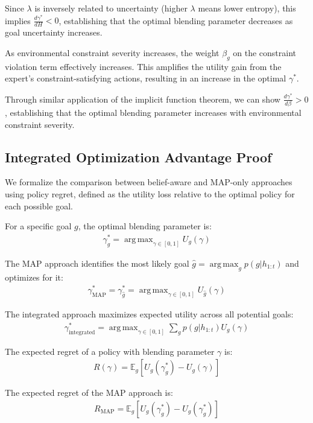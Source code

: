 \documentclass[11pt]{article}
\DeclareMathOperator*{\argmax}{arg\,max}
\begin{document}
Since $\lambda$ is inversely related to uncertainty (higher $\lambda$ means 
lower entropy), this implies $\frac{d\gamma^*}{dH} < 0$, establishing that 
the optimal blending parameter decreases as goal uncertainty increases.

As environmental constraint severity increases, the weight 
$\beta_g$ on the constraint violation term effectively increases. This amplifies 
the utility gain from the expert's constraint-satisfying actions, 
resulting in an increase in the optimal $\gamma^*$. 

Through similar application of the implicit function theorem, we can show 
$\frac{d\gamma^*}{d\beta} > 0$, establishing that the optimal blending parameter 
increases with environmental constraint severity.

\subsection{Integrated Optimization Advantage Proof}

We formalize the comparison between belief-aware and MAP-only approaches using policy 
regret, defined as the utility loss relative to the optimal policy for each possible goal.

For a specific goal $g$, the optimal blending parameter is:
\begin{align}
\gamma^*_g = \argmax_{\gamma \in [0,1]} U_g(\gamma)
\end{align}

The MAP approach identifies the most likely goal $\hat{g} = \argmax_g p(g|h_{1:t})$ 
and optimizes for it:
\begin{align}
\gamma^*_{\text{MAP}} = \gamma^*_{\hat{g}} = \argmax_{\gamma \in [0,1]} U_{\hat{g}}(\gamma)
\end{align}

The integrated approach maximizes expected utility across all potential goals:
\begin{align}
\gamma^*_{\text{integrated}} = \argmax_{\gamma \in [0,1]} \sum_g p(g|h_{1:t}) U_g(\gamma)
\end{align}

The expected regret of a policy with blending parameter $\gamma$ is:
\begin{align}
R(\gamma) = \mathbb{E}_g\left[U_g(\gamma^*_g) - U_g(\gamma)\right]
\end{align}

The expected regret of the MAP approach is:
\begin{align}
R_{\text{MAP}} = \mathbb{E}_g\left[U_g(\gamma^*_g) - U_g(\gamma^*_{\hat{g}})\right]
\end{align}
\end{document}
